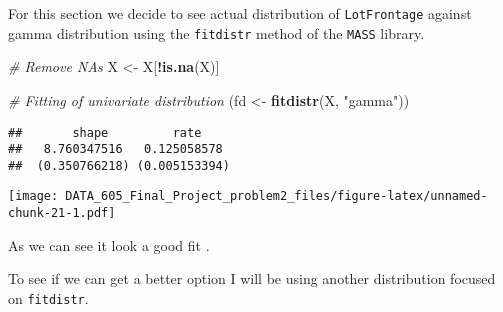 \documentclass[]{article}
\newenvironment{Shaded}{\begin{snugshade}}{\end{snugshade}}
\newcommand{\CommentTok}[1]{\textcolor[rgb]{0.56,0.35,0.01}{\textit{#1}}}
\newcommand{\DataTypeTok}[1]{\textcolor[rgb]{0.13,0.29,0.53}{#1}}
\newcommand{\DecValTok}[1]{\textcolor[rgb]{0.00,0.00,0.81}{#1}}
\newcommand{\KeywordTok}[1]{\textcolor[rgb]{0.13,0.29,0.53}{\textbf{#1}}}
\newcommand{\NormalTok}[1]{#1}
\newcommand{\OperatorTok}[1]{\textcolor[rgb]{0.81,0.36,0.00}{\textbf{#1}}}
\newcommand{\OtherTok}[1]{\textcolor[rgb]{0.56,0.35,0.01}{#1}}
\newcommand{\StringTok}[1]{\textcolor[rgb]{0.31,0.60,0.02}{#1}}
\begin{document}
For this section we decide to see actual distribution of
\texttt{LotFrontage} against gamma distribution using the
\texttt{fitdistr} method of the \texttt{MASS} library.

\begin{Shaded}
\begin{Highlighting}[]
\CommentTok{# Remove NAs}
\NormalTok{X <-}\StringTok{ }\NormalTok{X[}\OperatorTok{!}\KeywordTok{is.na}\NormalTok{(X)]}

\CommentTok{# Fitting of univariate distribution}
\NormalTok{(fd <-}\StringTok{ }\KeywordTok{fitdistr}\NormalTok{(X, }\StringTok{"gamma"}\NormalTok{))}
\end{Highlighting}
\end{Shaded}

\begin{verbatim}
##       shape         rate    
##   8.760347516   0.125058578 
##  (0.350766218) (0.005153394)
\end{verbatim}

\begin{Shaded}
\end{Shaded}

\texttt{[image: DATA\_605\_Final\_Project\_problem2\_files/figure-latex/unnamed-chunk-21-1.pdf]}

As we can see it look a good fit .

To see if we can get a better option I will be using another
distribution focused on \texttt{fitdistr}.
\end{document}
